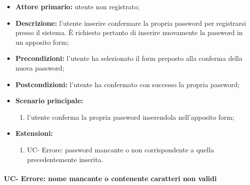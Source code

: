 	\begin{itemize}
		\item \textbf{Attore primario:} utente non registrato;
	
		\item \textbf{Descrizione:} l'utente inserire confermare la propria password per registrarsi presso il sistema. \`{E} richiesto pertanto di inserire nuovamente la password in un apposito form;

		\item \textbf{Precondizioni:} l'utente ha selezionato il form preposto alla conferma della nuova password;

		\item \textbf{Postcondizioni:} l'utente ha confermato con successo la propria password;

		\item \textbf{Scenario principale:}
			\begin{enumerate}
		  		\item l'utente conferma la propria password inserendola nell'apposito form;
	  		\end{enumerate}
		\item \textbf{Estensioni:}
	  		\begin{enumerate}
		  		\item UC- Errore: password mancante o non corrispondente a quella precedentemente inserita.
	  		\end{enumerate}
	\end{itemize}

\paragraph{UC- Errore: nome mancante o contenente caratteri non validi}

